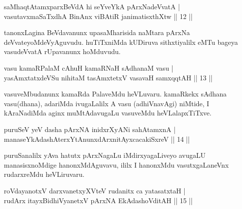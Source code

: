 \begin{shl}
saMhaqtAtamxparxBeVdA hi seYveYkA pArxNadeVvatA |\\
vasutavx\footnotemark[2]{}maSaTxdhA BinAnx viBAtiR janimatisxthXtw \hfill || 12 ||
\end{shl}

\begin{artha}
tanonxLagina BeVdavanunx upasaMharisida naMtara pArxNa deVvateyoMdeVyAguvudu. huTiTxniMda kUDiruva sithxtiyalilx eMTu bageya vasudeVvatA rUpavanunx hoMduvudu.
\end{artha}


\begin{shl}
vasu kamaRPalaM cA\s \s huH kamaRNaH sAdhanaM vasu |\\
yasAmxtatxdeVSu nihitaM tasAmxtetxV vasavaH samxqqtAH \hfill || 13 ||
\end{shl}

\begin{artha}
vasuveMbudanunx kamaRda PalaveMdu heVLuvaru. kamaRkekx sAdhana vasu(dhana), adariMda ivugaLalilx A vasu (adhiVnavAgi) niMtide, I kAraNadiMda aginx muMtAdavugaLu vasuveMdu heVLalapxTiTxve.
\end{artha}


\begin{shl}
puruSeV yeV dasha pArxNA inidxrXyANi sahA\s \s tamxnA |\\
manaseYkAdashAterxYtAnunxdArxnitAyxcacakiSxreV \hfill || 14 ||
\end{shl}

\begin{artha}
puruSanalilx yAva hatutx pArxNagaLu iMdirxyagaLiveyo avugaLU manasisxnoMdige hanonxMdAguvavu, ililx I hanonxMdu vasutxgaLaneVnx rudarxreMdu heVLiruvaru.
\end{artha}


\begin{shl}
roVdayanotxV darxvanetxyXVteV rudanitx ca yatasatxtaH |\\
rudArx itayxBidhiVyanetxV pArxNA EkAdashoVditAH \hfill || 15 ||
\end{shl}

